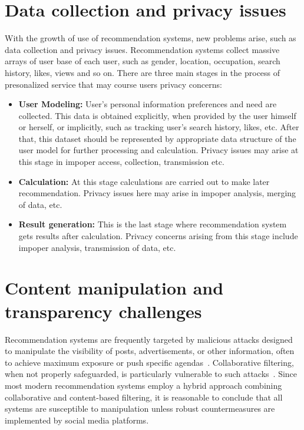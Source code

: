 \documentclass[10pt,twocolumn,twoside,a4paper]{article} %
\begin{document}
\section{Data collection and privacy issues} \label{data_issues}
With the growth of use of recommendation systems, new problems arise, such as data collection and privacy issues.
Recommendation systems collect massive arrays of user base of each user, such as gender, location, occupation, search history, likes, views and so on.
There are three \cite{PrivacyProtectionSurvey} main stages in the process of presonalized service that may course users privacy concerns:
\begin{itemize}
    \item \textbf{User Modeling:} User's personal information preferences and need are collected. This data is obtained explicitly, when provided by the user himself or herself, or implicitly, such as tracking user's search history, likes, etc. After that, this dataset should be represented by appropriate data structure of the user model for further processing and calculation. Privacy issues may arise at this stage in impoper access, collection, transmission etc.
    \item \textbf{Calculation:} At this stage calculations are carried out to make later recommendation. Privacy issues here may arise in impoper analysis, merging of data, etc.
    \item \textbf{Result generation:} This is the last stage where recommendation system gets results after calculation. Privacy concerns arising from this stage include impoper analysis, transmission of data, etc.
\end{itemize}

\section{Content manipulation and transparency challenges} \label{content_manipulation}
Recommendation systems are frequently targeted by malicious attacks designed to manipulate the visibility of posts, advertisements, or other information, often to achieve maximum exposure or push specific agendas~\cite{propagandasafety}. Collaborative filtering, when not properly safeguarded, is particularly vulnerable to such attacks~\cite{ManipulationAttacks}. Since most modern recommendation systems employ a hybrid approach combining collaborative and content-based filtering, it is reasonable to conclude that all systems are susceptible to manipulation unless robust countermeasures are implemented by social media platforms.
\end{document}
